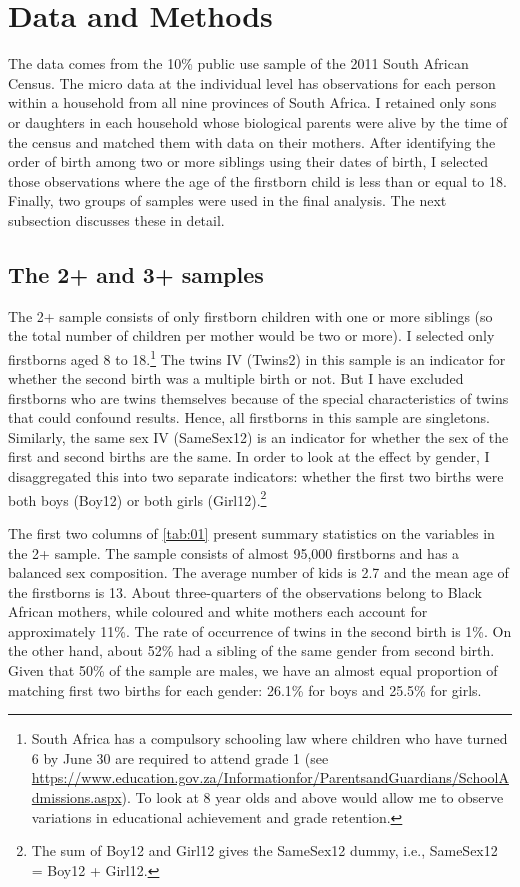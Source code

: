 
\section{Data and Methods}

The data comes from the 10\% public use sample of the 2011 South African Census. The micro data at the individual level has observations for each person within a household from all nine provinces of South Africa. I retained only sons or daughters in each household whose biological parents were alive by the time of the census and matched them with data on their mothers. After identifying the order of birth among two or more siblings using their dates of birth, I selected those observations where the age of the firstborn child is less than or equal to 18. Finally, two groups of samples were used in the final analysis. The next subsection discusses these in detail.

\subsection{The 2+ and 3+ samples}

The 2+ sample consists of only firstborn children with one or more siblings (so the total number of children per mother would be two or more). I selected only firstborns aged 8 to 18.\footnote{ South Africa has a compulsory schooling law where children who have turned 6 by June 30 are required to attend grade 1 (see \url{https://www.education.gov.za/Informationfor/ParentsandGuardians/SchoolAdmissions.aspx}). To look at 8 year olds and above would allow me to observe variations in educational achievement and grade retention. }  The twins IV (Twins2) in this sample is an indicator for whether the second birth was a multiple birth or not. But I have excluded firstborns who are twins themselves because of the special characteristics of twins that could confound results. Hence, all firstborns in this sample are singletons. Similarly, the same sex IV (SameSex12) is an indicator for whether the sex of the first and second births are the same. In order to look at the effect by gender, I disaggregated this into two separate indicators: whether the first two births were both boys (Boy12) or both girls (Girl12).\footnote{ The sum of Boy12 and Girl12 gives the SameSex12 dummy, i.e., SameSex12 = Boy12 + Girl12. }  

The first two columns of \autoref{tab:01} present summary statistics on the variables in the 2+ sample. The sample consists of almost 95,000 firstborns and has a balanced sex composition. The average number of kids is 2.7 and the mean age of the firstborns is 13. About three-quarters of the observations belong to Black African mothers, while coloured and white mothers each account for approximately 11\%. The rate of occurrence of twins in the second birth is 1\%. On the other hand, about 52\% had a sibling of the same gender from second birth. Given that 50\% of the sample are males, we have an almost equal proportion of matching first two births for each gender: 26.1\% for boys and 25.5\% for girls. 

